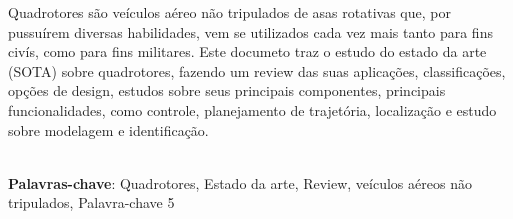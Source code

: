 \begin{thesisresumo}

Quadrotores são veículos aéreo não tripulados de asas rotativas que, por pussuírem diversas habilidades, vem se utilizados cada vez mais tanto para fins civís, como para fins militares. Este documeto traz o estudo do estado da arte (SOTA) sobre quadrotores, fazendo um review das suas aplicações, classificações, opções de design, estudos sobre seus principais componentes, principais funcionalidades, como controle, planejamento de trajetória, localização e estudo sobre modelagem e identificação.

\ \\


\textbf{Palavras-chave}: Quadrotores, Estado da arte, Review, veículos aéreos não tripulados, Palavra-chave 5

\end{thesisresumo}
